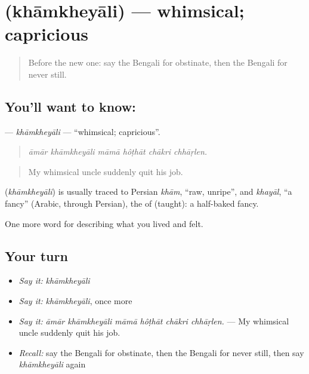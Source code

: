 \section[\texorpdfstring{\bn{খামখেয়ালি} (khāmkheyāli)}{খামখেয়ালি (khāmkheyāli)}]{ (khāmkheyāli) — whimsical; capricious}

\label{lesson:BN-C461-khamkheyali}



\begin{quote}
Before the new one: say the Bengali for obstinate, then the Bengali for never still.
\end{quote}

\subsection*{You'll want to know: }
\textbf{} — \emph{khāmkheyāli} — \textquotedblleft{}whimsical; capricious\textquotedblright{}.

\begin{quote}
     
\end{quote}

\begin{quote}
\emph{āmār khāmkheyāli māmā hôṭhāt chākri chhāṛlen.}
\end{quote}

\begin{quote}
My whimsical uncle suddenly quit his job.
\end{quote}

\begin{cousinweb}
\textbf{} (\emph{khāmkheyāli}) is usually traced to Persian \emph{khām}, \textquotedblleft{}raw, unripe\textquotedblright{}, and \emph{khayāl}, \textquotedblleft{}a fancy\textquotedblright{} (Arabic, through Persian), the  of   (taught): a half-baked fancy.
\end{cousinweb}

\begin{grammarlens}[title={What you've built}]
One more word for describing what you lived and felt.
\end{grammarlens}

\subsection*{Your turn}
\begin{itemize}
\raggedright
  \item \emph{Say it:} \emph{khāmkheyāli}
  \item \emph{Say it:} \emph{khāmkheyāli}, once more
  \item \emph{Say it:} \emph{āmār khāmkheyāli māmā hôṭhāt chākri chhāṛlen.} — My whimsical uncle suddenly quit his job.
  \item \emph{Recall:} say the Bengali for obstinate, then the Bengali for never still, then say \emph{khāmkheyāli} again
\end{itemize}

